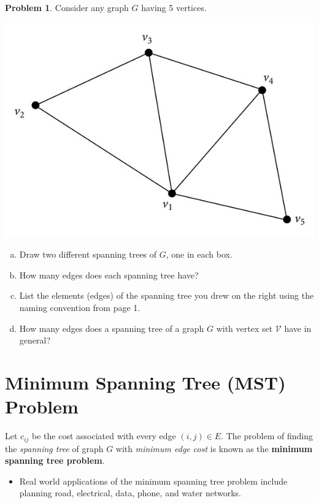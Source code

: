 \documentclass[11pt]{article}
\theoremstyle{definition}
\newtheorem{problem}{Problem}
\newcommand{\answerbox}[3]{%
  \fbox{%
    \begin{minipage}[#1]{#2}
      \hfill\vspace{#3}
    \end{minipage}
  }
}
\newcommand{\answerboxone}[2]{%
  \answerbox{#1}{6.0in}{#2} 
}
\newcommand{\letterbox}{\answerbox{c}{.7cm}{.7cm}}
\begin{document}
\begin{problem}
Consider any graph $G$ having 5 vertices.  

\begin{center}
\includegraphics[width=.4\textwidth]{graph5}
\end{center}

\begin{enumerate}[(a)]
\item Draw two different spanning trees of $G$, one in each box.

\answerbox{c}{3.0in}{5cm} 
\answerbox{c}{3.0in}{5cm} 

\item How many edges does each spanning tree have?  \letterbox
\item List the elements (edges) of the spanning tree you drew on the right using the naming convention from page 1. 

	\answerboxone{c}{2cm}
\item How many edges does a spanning tree of a graph $G$ with vertex set $\mathcal{V}$ have in general?

	\answerboxone{c}{2cm}

\end{enumerate}
\end{problem}

\newpage
\section{Minimum Spanning Tree (MST) Problem}

\begin{tcolorbox}
Let $c_{ij}$ be the cost associated with every edge $(i,j) \in E$. The problem of finding the \emph{spanning tree} of graph $G$ with \emph{minimum edge cost} is known as the \textbf{minimum spanning tree problem}.
\end{tcolorbox}

\begin{itemize}
\item  Real world applications of the minimum spanning tree problem include planning road, electrical, data, phone, and water networks.  
\end{itemize}
\end{document}
